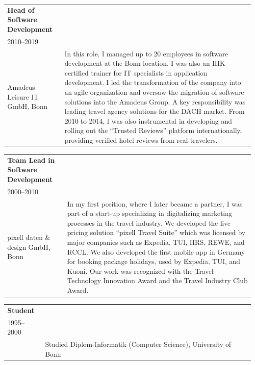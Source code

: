 \documentclass[a4paper,10pt]{article}
\begin{document}
\begin{tabularx}{\textwidth}{>{\raggedright}p{4.5cm}X}
  \textbf{\color{sectionblue}Head of Software Development} \\
  {\color{sectiongray}2010–2019}                           \\
  \vspace{1.5em}
  Amadeus Leisure IT GmbH, Bonn
   &
  In this role, I managed up to 20 employees in software development at the Bonn location.
  I was also an IHK-certified trainer for IT specialists in application development.
  I led the transformation of the company into an agile organization and oversaw the migration of software solutions into the Amadeus Group.
  A key responsibility was leading travel agency solutions for the DACH market.
  From 2010 to 2014, I was also instrumental in developing and rolling out the “Trusted Reviews” platform internationally, providing verified hotel reviews from real travelers.
\end{tabularx}

\vspace{1em}
\noindent{\color{sectionblue}\rule{\textwidth}{0.4pt}}
\vspace{1em}

\begin{tabularx}{\textwidth}{>{\raggedright}p{4.5cm}X}
  \textbf{\color{sectionblue}Team Lead in Software Development} \\
  {\color{sectiongray}2000–2010}                                \\
  \vspace{1.5em}
  pixell daten \& design GmbH, Bonn
   &
  In my first position, where I later became a partner, I was part of a start-up specializing in digitalizing marketing processes in the travel industry.
  We developed the live pricing solution \enquote{pixell Travel Suite} which was licensed by major companies such as Expedia, TUI, HRS, REWE, and RCCL.\@
  We also developed the first mobile app in Germany for booking package holidays,
  used by Expedia, TUI, and Kuoni. Our work was recognized with the Travel
  Technology Innovation Award and the Travel Industry Club Award.
\end{tabularx}

\vspace{1em}
\noindent{\color{sectionblue}\rule{\textwidth}{0.4pt}}
\vspace{1em}

\begin{tabularx}{\textwidth}{>{\raggedright}p{4.5cm}X}
  \textbf{\color{sectionblue}Student} \\
  {\color{sectiongray}1995–2000}      \\
  \vspace{1.5em}
   &
  Studied Diplom-Informatik (Computer Science), University of Bonn
\end{tabularx}
\end{document}
